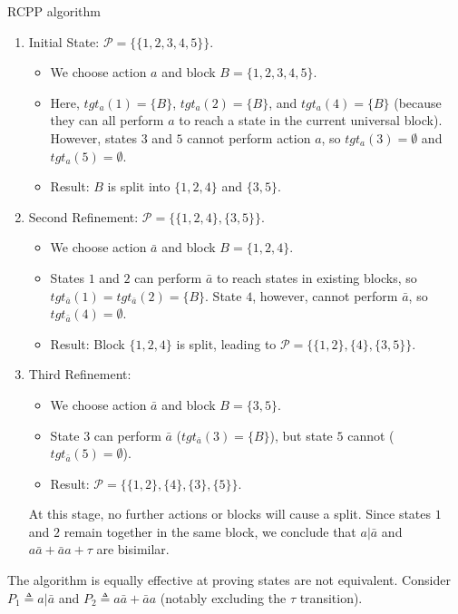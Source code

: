 \begin{Example}{RCPP algorithm}{}
    \begin{enumerate}
        \item Initial State: $\mathcal{P} = \{\{1, 2, 3, 4, 5\}\}$.
        \begin{itemize}
            \item We choose action $a$ and block $B = \{1, 2, 3, 4, 5\}$.
            \item Here, $tgt_a(1) = \{B\}$, $tgt_a(2) = \{B\}$, and $tgt_a(4) = \{B\}$ (because they can all perform $a$ to reach a state in the current universal block). However, states $3$ and $5$ cannot perform action $a$, so $tgt_a(3) = \emptyset$ and $tgt_a(5) = \emptyset$.  
            \item Result: $B$ is split into $\{1, 2, 4\}$ and $\{3, 5\}$.  
        \end{itemize}
        \item Second Refinement: $\mathcal{P} = \{\{1, 2, 4\}, \{3, 5\}\}$.
        \begin{itemize}
            \item We choose action $\bar{a}$ and block $B = \{1, 2, 4\}$.
            \item States $1$ and $2$ can perform $\bar{a}$ to reach states in existing blocks, so $tgt_{\bar{a}}(1) = tgt_{\bar{a}}(2) = \{B\}$. State $4$, however, cannot perform $\bar{a}$, so $tgt_{\bar{a}}(4) = \emptyset$.  
            \item Result: Block $\{1, 2, 4\}$ is split, leading to $\mathcal{P} = \{\{1, 2\}, \{4\}, \{3, 5\}\}$.  
        \end{itemize}
        \item Third Refinement:
        \begin{itemize}
            \item We choose action $\bar{a}$ and block $B = \{3, 5\}$.
            \item State $3$ can perform $\bar{a}$ ($tgt_{\bar{a}}(3) = \{B\}$), but state $5$ cannot ($tgt_{\bar{a}}(5) = \emptyset$).  
            \item Result: $\mathcal{P} = \{\{1, 2\}, \{4\}, \{3\}, \{5\}\}$.  
        \end{itemize}
        
        At this stage, no further actions or blocks will cause a split. Since states $1$ and $2$ remain together in the same block, we conclude that $a|\bar{a}$ and $a\bar{a} + \bar{a}a + \tau$ are bisimilar.  
    \end{enumerate}

    The algorithm is equally effective at proving states are not equivalent. Consider $P_1 \triangleq a|\bar{a}$ and $P_2 \triangleq a\bar{a} + \bar{a}a$ (notably excluding the $\tau$ transition).  


\end{Example}
